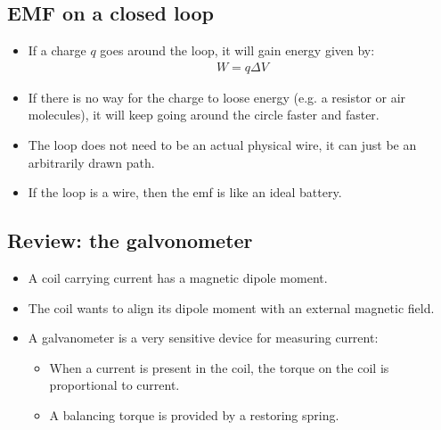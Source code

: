 \documentclass[aspectratio=169,
hyperref={colorlinks,urlcolor=blue}
]{beamer}
\begin{document}
\subsection{EMF on a closed loop}
\label{subsec:emfonaclosedloop}
{
\begin{itemize}
\item If a charge $q$ goes around the loop, it will gain energy given by:
\begin{align*}
W=q\Delta V
\end{align*}
\item If there is no way for the charge to loose energy (e.g. a resistor or air molecules), it will keep going around the circle faster and faster.
\item The loop does not need to be an actual physical wire, it can just be an arbitrarily drawn path.
\item If the loop is a wire, then the emf is like an ideal battery.
\end{itemize}
}
{
\centering
{}

}


\subsection{Review: the galvonometer}
\label{subsec:reviewthegalvonometer}
{
\begin{itemize}
\item A coil carrying current has a magnetic dipole moment.
\item The coil wants to align its dipole moment with an external magnetic field.
\item A galvanometer is a very sensitive device for measuring current:
\begin{itemize}
\item When a current is present in the coil, the torque on the coil is proportional to current.
\item A balancing torque is provided by a restoring spring.
\end{itemize}
\end{itemize}
}
{
}
\end{document}
